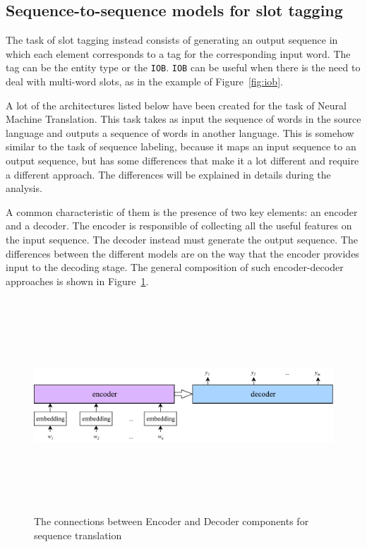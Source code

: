 \subsection{Sequence-to-sequence models for slot tagging}
\label{soaSeq2Seq}

The task of slot tagging instead consists of generating an output sequence in which each element corresponds to a tag for the corresponding input word. The tag can be the entity type or the \texttt{IOB}. \texttt{IOB} can be useful when there is the need to deal with multi-word slots, as in the example of Figure~\ref{fig:iob}.

A lot of the architectures listed below have been created for the task of Neural Machine Translation. This task takes as input the sequence of words in the source language and outputs a sequence of words in another language. This is somehow similar to the task of sequence labeling, because it maps an input sequence to an output sequence, but has some differences that make it a lot different and require a different approach. The differences will be explained in details during the analysis.

A common characteristic of them is the presence of two key elements: an encoder and a decoder. The encoder is responsible of collecting all the useful features on the input sequence. The decoder instead must generate the output sequence. The differences between the different models are on the way that the encoder provides input to the decoding stage. The general composition of such encoder-decoder approaches is shown in Figure~\ref{fig:encoderDecoder}.

\begin{figure}[!htb]
    \centering
    \includegraphics[max width=0.9\linewidth,max height=8cm,keepaspectratio]{figures/encoderDecoder}
    \caption{The connections between Encoder and Decoder components for sequence translation}\label{fig:encoderDecoder}
\end{figure}

